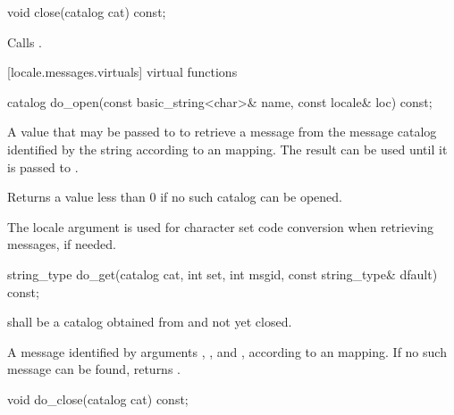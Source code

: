 %
%
\begin{itemdecl}
void  close(catalog cat) const;
\end{itemdecl}

\begin{itemdescr}
\pnum
\effects
Calls
.
\end{itemdescr}

[locale.messages.virtuals]{ virtual functions}

%
%
\begin{itemdecl}
catalog do_open(const basic_string<char>& name,
                const locale& loc) const;
\end{itemdecl}

\begin{itemdescr}
\pnum
\returns
A value that may be passed to
to retrieve a message from the message catalog identified by the string
 according to an  mapping.
The result can be used until it is passed to
.

\pnum
Returns a value less than 0 if no such catalog can be opened.

\pnum
\remarks
The locale argument 
is used for character set code conversion when retrieving
messages, if needed.
\end{itemdescr}

%
%
\begin{itemdecl}
string_type do_get(catalog cat, int set, int msgid,
              const string_type& dfault) const;
\end{itemdecl}

\begin{itemdescr}
\pnum
\requires
{} shall be a catalog obtained from
and not yet closed.

\pnum
\returns
A message identified by arguments , , and , according
to an  mapping. If no
such message can be found, returns .
\end{itemdescr}

%
%
\begin{itemdecl}
void do_close(catalog cat) const;
\end{itemdecl}

